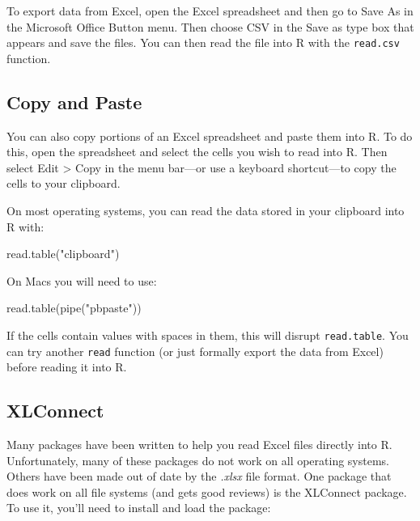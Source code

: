 \documentclass[
  letterpaper,
  DIV=11,
  numbers=noendperiod]{scrbook}
\newenvironment{Shaded}{\begin{snugshade}}{\end{snugshade}}
\newcommand{\FunctionTok}[1]{\textcolor[rgb]{0.28,0.35,0.67}{#1}}
\newcommand{\NormalTok}[1]{\textcolor[rgb]{0.00,0.23,0.31}{#1}}
\newcommand{\StringTok}[1]{\textcolor[rgb]{0.13,0.47,0.30}{#1}}
\begin{document}
To export data from Excel, open the Excel spreadsheet and then go to
Save As in the Microsoft Office Button menu. Then choose CSV in the Save
as type box that appears and save the files. You can then read the file
into R with the \texttt{read.csv} function.

\subsection{Copy and Paste}\label{copy-and-paste}

You can also copy portions of an Excel spreadsheet and paste them into
R. To do this, open the spreadsheet and select the cells you wish to
read into R. Then select Edit \textgreater{} Copy in the menu bar---or
use a keyboard shortcut---to copy the cells to your clipboard.

On most operating systems, you can read the data stored in your
clipboard into R with:

\begin{Shaded}
\begin{Highlighting}[]
\FunctionTok{read.table}\NormalTok{(}\StringTok{"clipboard"}\NormalTok{)}
\end{Highlighting}
\end{Shaded}

On Macs you will need to use:

\begin{Shaded}
\begin{Highlighting}[]
\FunctionTok{read.table}\NormalTok{(}\FunctionTok{pipe}\NormalTok{(}\StringTok{"pbpaste"}\NormalTok{))}
\end{Highlighting}
\end{Shaded}

If the cells contain values with spaces in them, this will disrupt
\texttt{read.table}. You can try another \texttt{read} function (or just
formally export the data from Excel) before reading it into R.

\subsection{XLConnect}\label{xlconnect}

Many packages have been written to help you read Excel files directly
into R. Unfortunately, many of these packages do not work on all
operating systems. Others have been made out of date by the \emph{.xlsx}
file format. One package that does work on all file systems (and gets
good reviews) is the XLConnect package. To use it, you'll need to
install and load the package:
\end{document}
